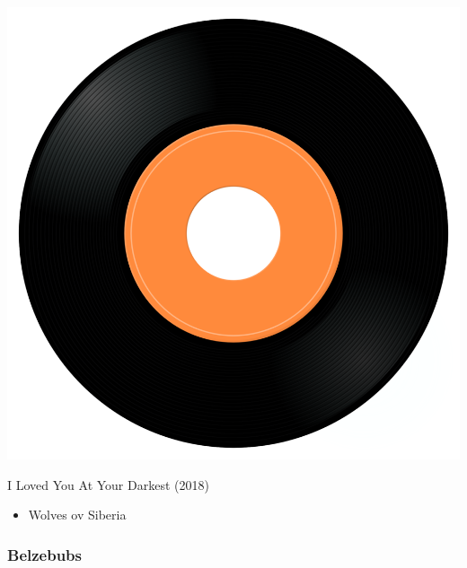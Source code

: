 \begin{minipage}[t]{0.25\textwidth}\vspace{0pt}
\captionsetup{type=figure}
\includegraphics[width=\textwidth]{Images/cover.png}
\caption*{I Loved You At Your Darkest (2018)}
\end{minipage}
\begin{minipage}[t]{0.25\textwidth}\vspace{0pt}
\begin{itemize}[nosep,leftmargin=1em,labelwidth=*,align=left]
	\setlength{\itemsep}{0pt}
	\item Wolves ov Siberia
\end{itemize}
\end{minipage}

\subsubsection{Belzebubs}

